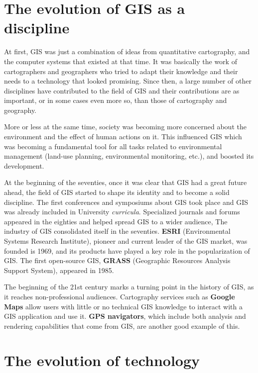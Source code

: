 \section{The evolution of GIS as a discipline}

At first, GIS was just a combination of ideas from quantitative cartography, and the computer systems that existed at that time. It was basically the work of cartographers and geographers who tried to adapt their knowledge and their needs to a technology that looked promising. Since then, a large number of other disciplines have contributed to the field of GIS and their contributions are as important, or in some cases even more so, than those of cartography and geography.

More or less at the same time, society was becoming more concerned about the environment and the effect of human actions on it. This influenced GIS which was becoming a fundamental tool for all tasks related to environmental management (land-use planning, environmental monitoring, etc.), and boosted its development.

At the beginning of the seventies, once it was clear that GIS had a great future ahead, the field of GIS started to shape its identity and to become a solid discipline. The first conferences and symposiums about GIS took place and GIS was already included in University \emph{curricula}. Specialized journals and forums appeared in the eighties and helped spread GIS to a wider audience, The industry of GIS consolidated itself in the seventies. \textbf{ESRI} (Environmental Systems Research Institute), pioneer and current leader of the GIS market, was founded is 1969, and its products have played a key role in the popularization of GIS. The first open-source GIS, \textbf{GRASS} (Geographic Resources Analysis Support System), appeared in 1985.

The beginning of the 21st century marks a turning point in the history of GIS, as it reaches non-professional audiences. Cartography services such as \textbf{Google Maps} allow users with little or no technical GIS knowledge to interact with a GIS application and use it. \textbf{GPS navigators}, which include both analysis and rendering capabilities that come from GIS, are another good example of this.

\section{The evolution of technology}

